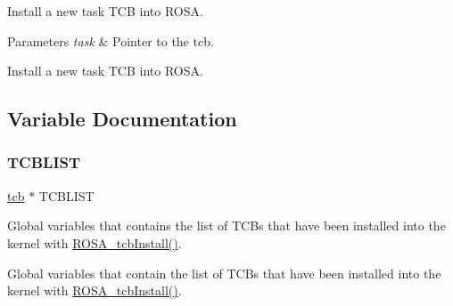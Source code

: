 Install a new task T\+CB into R\+O\+SA. 


\begin{DoxyParams}{Parameters}
{\em task} & Pointer to the tcb.\\
\hline
\end{DoxyParams}
Install a new task T\+CB into R\+O\+SA. 

\subsection{Variable Documentation}
\mbox{\label{group__rosa__kernel__module_ga5235b1f3c05638da958e7832f223e19c}} 
\subsubsection{\texorpdfstring{T\+C\+B\+L\+I\+ST}{TCBLIST}}
{\footnotesize\ttfamily \mbox{\hyperlink{structtcb__record__t}{tcb}} $\ast$ T\+C\+B\+L\+I\+ST}



Global variables that contains the list of T\+CB\textquotesingle{}s that have been installed into the kernel with \mbox{\hyperlink{group__rosa__kernel__module_ga9a7bde19bc8609de66353d1f51d09eda}{R\+O\+S\+A\+\_\+tcb\+Install()}}. 

Global variables that contain the list of T\+CB\textquotesingle{}s that have been installed into the kernel with \mbox{\hyperlink{group__rosa__kernel__module_ga9a7bde19bc8609de66353d1f51d09eda}{R\+O\+S\+A\+\_\+tcb\+Install()}}. 